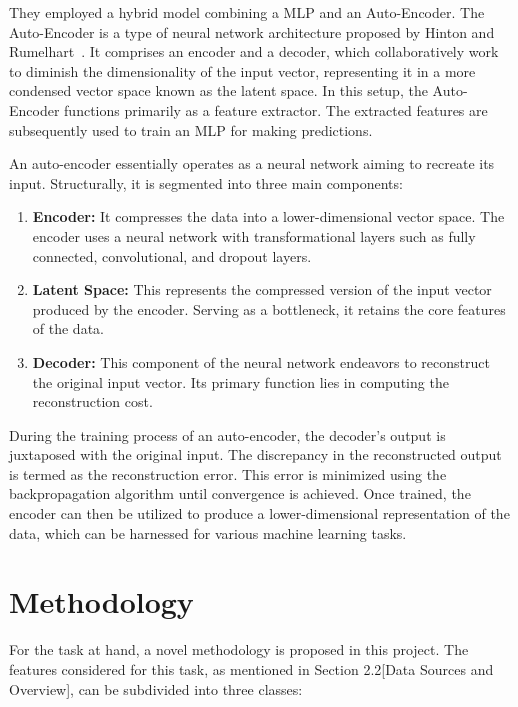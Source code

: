 \documentclass[a4paper,12pt]{Classes/RoboticsLaTeX}
\begin{document}
	They employed a hybrid model combining a \ac{MLP} and an Auto-Encoder. The Auto-Encoder is a type of neural network architecture proposed by 
	Hinton and Rumelhart~\cite{rumelhart1986}. It comprises an encoder and a decoder, which collaboratively work to diminish the dimensionality of the input vector, 
	representing it in a more condensed vector space known as the latent space. In this setup, the Auto-Encoder functions primarily as a feature extractor. 
	The extracted features are subsequently used to train an \ac{MLP} for making predictions.

	An auto-encoder essentially operates as a neural network aiming to recreate its input. Structurally, it is segmented into three main components:

	\begin{enumerate}
		\item \textbf{Encoder:} It compresses the data into a lower-dimensional vector space. The encoder uses a neural network with transformational layers such as fully connected,
		 convolutional, and dropout layers.
		
		\item \textbf{Latent Space:} This represents the compressed version of the input vector produced by the encoder. Serving as a bottleneck, it retains the core features of
		 the data.
		
		\item \textbf{Decoder:} This component of the neural network endeavors to reconstruct the original input vector. Its primary function lies in computing 
		the reconstruction cost.
	\end{enumerate}

	During the training process of an auto-encoder, the decoder's output is juxtaposed with the original input. The discrepancy in the reconstructed output is termed as the reconstruction error. 
	This error is minimized using the backpropagation algorithm until convergence is achieved. Once trained, the encoder can then be utilized to produce a lower-dimensional 
	representation of the data, which can be harnessed for various machine learning tasks.

	\chapter{Methodology}
	\label{chap:methodology}

	For the task at hand, a novel methodology is proposed in this project. The features considered for this task, as mentioned in Section 2.2[Data Sources and Overview], 
	can be subdivided into three classes:
\end{document}

